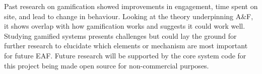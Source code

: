 Past research on gamification showed improvements in engagement, time spent on site, and lead to change in behaviour. Looking at the theory underpinning A\&F, it shows overlap with how gamification works and suggests it could work well. Studying gamified systems presents challenges but could lay the ground for further research to elucidate which elements or mechanism are most important for future \gls{EAF}. Future research will be supported by the core system code for this project being made open source for non-commercial purposes.